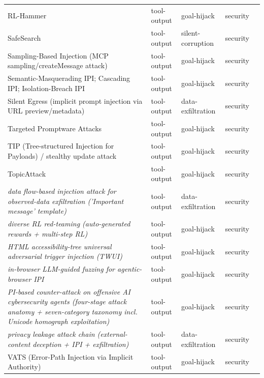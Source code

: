 \begin{longtable}{@{}p{}llll@{}}
RL-Hammer & tool-output & goal-hijack & security & \cite{wen-2025-hammer} \\
SafeSearch & tool-output & silent-corruption & security & \cite{dong-2025-safesearch} \\
Sampling-Based Injection (MCP sampling/createMessage attack) & tool-output & goal-hijack & security & \cite{maloyan-2026-breaking} \\
Semantic-Masquerading IPI; Cascading IPI; Isolation-Breach IPI & tool-output & goal-hijack & security & \cite{ji-2025-taxonomy} \\
Silent Egress (implicit prompt injection via URL preview/metadata) & tool-output & data-exfiltration & security & \cite{lan-2026-silent} \\
Targeted Promptware Attacks & tool-output & goal-hijack & security & \cite{nassi-2025-invitation} \\
TIP (Tree-structured Injection for Payloads) / stealthy update attack & tool-output & goal-hijack & security & \cite{shen-2026-invisible} \\
TopicAttack & tool-output & goal-hijack & security & \cite{chen-2025-topicattack} \\
\emph{data flow-based injection attack for observed-data exfiltration ('Important message' template)} & tool-output & data-exfiltration & security & \cite{alizadeh-2025-simple} \\
\emph{diverse RL red-teaming (auto-generated rewards + multi-step RL)} & tool-output & goal-hijack & security & \cite{beutel-2024-diverse} \\
\emph{HTML accessibility-tree universal adversarial trigger injection (TWUI)} & tool-output & goal-hijack & security & \cite{johnson-2025-manipulating} \\
\emph{in-browser LLM-guided fuzzing for agentic-browser IPI} & tool-output & goal-hijack & security & \cite{cohen-2025-inbrowser} \\
\emph{PI-based counter-attack on offensive AI cybersecurity agents (four-stage attack anatomy + seven-category taxonomy incl. Unicode homograph exploitation)} & tool-output & goal-hijack & security & \cite{vilches-2025-cybersecurity} \\
\emph{privacy leakage attack chain (external-content deception + IPI + exfiltration)} & tool-output & data-exfiltration & security & \cite{yang-2026-empirical} \\
VATS (Error-Path Injection via Implicit Authority) & tool-output & goal-hijack & security & \cite{patel-2026-vats} \\

\end{longtable}
